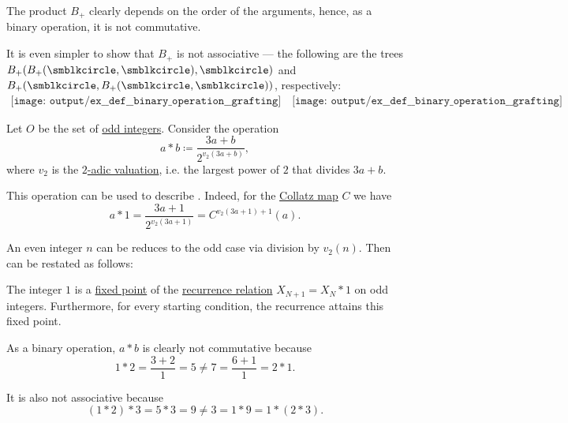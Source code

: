 \begin{example}
\begin{thmenum}
    The product \( B_+ \) clearly depends on the order of the arguments, hence, as a binary operation, it is not commutative.

    It is even simpler to show that \( B_+ \) is not associative --- the following are the trees \( B_+(B_+(\anon, \anon), \anon) \) and \( B_+(\anon, B_+(\anon, \anon)) \), respectively:
    \begin{equation*}
      \begin{aligned}
        \texttt{[image: output/ex\_\_def\_\_binary\_operation\_\_grafting]}
        \quad
        \texttt{[image: output/ex\_\_def\_\_binary\_operation\_\_grafting]}
      \end{aligned}
    \end{equation*}

     Let \( O \) be the set of \hyperref[def:integer_parity]{odd integers}. Consider the operation
    \begin{equation}\label{eq:ex:def:binary_operation/collatz}
      a \ast b \coloneqq \frac {3a + b} {2^{v_2(3a + b)}},
    \end{equation}
    where \( v_2 \) is the \hyperref[def:padic_valuation]{\( 2 \)-adic valuation}, i.e. the largest power of \( 2 \) that divides \( 3a + b \).

    This operation can be used to describe . Indeed, for the \hyperref[def:collatz_map]{Collatz map} \( C \) we have
    \begin{equation*}
      a \ast 1 = \frac {3a + 1} {2^{v_2(3a + 1)}} = C^{v_2(3a + 1) + 1} (a).
    \end{equation*}

    An even integer \( n \) can be reduces to the odd case via division by \( v_2(n) \). Then  can be restated as follows:
    \begin{displayquote}
      The integer \( 1 \) is a \hyperref[def:dynamical_system_fixed_point]{fixed point} of the \hyperref[def:recurrence_relation]{recurrence relation} \( X_{N+1} = X_N \ast 1 \) on odd integers. Furthermore, for every starting condition, the recurrence attains this fixed point.
    \end{displayquote}

    As a binary operation, \( a \ast b \) is clearly not commutative because
    \begin{equation*}
      1 \ast 2 = \frac {3 + 2} 1 = 5 \neq 7 = \frac {6 + 1} 1= 2 \ast 1.
    \end{equation*}

    It is also not associative because
    \begin{equation*}
      (1 \ast 2) \ast 3 = 5 \ast 3 = 9 \neq 3 = 1 \ast 9 = 1 \ast (2 \ast 3).
    \end{equation*}
  \end{thmenum}
\end{example}

